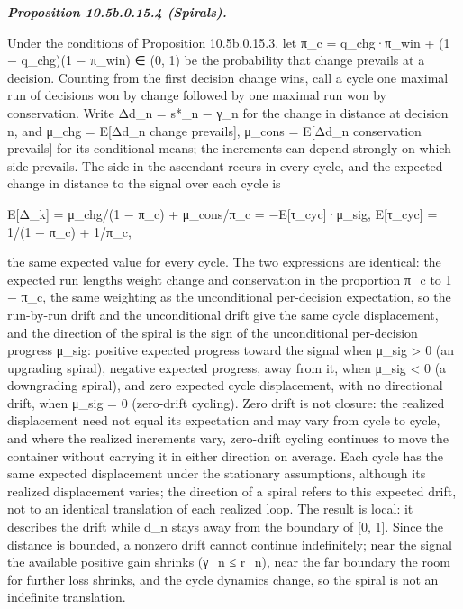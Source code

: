 \documentclass[
]{article}
\begin{document}
\emph{\textbf{Proposition 10.5b.0.15.4 (Spirals).}}

Under the conditions of Proposition 10.5b.0.15.3, let π\_c =
q\_chg·π\_win + (1 − q\_chg)(1 − π\_win) ∈ (0, 1) be the probability
that change prevails at a decision. Counting from the first decision
change wins, call a cycle one maximal run of decisions won by change
followed by one maximal run won by conservation. Write Δd\_n = s*\_n −
γ\_n for the change in distance at decision n, and μ\_chg = E{[}Δd\_n
\textbar{} change prevails{]}, μ\_cons = E{[}Δd\_n \textbar{}
conservation prevails{]} for its conditional means; the increments can
depend strongly on which side prevails. The side in the ascendant recurs
in every cycle, and the expected change in distance to the signal over
each cycle is

E{[}Δ\_k{]} = μ\_chg/(1 − π\_c) + μ\_cons/π\_c = −E{[}τ\_cyc{]}·μ\_sig,
E{[}τ\_cyc{]} = 1/(1 − π\_c) + 1/π\_c,

the same expected value for every cycle. The two expressions are
identical: the expected run lengths weight change and conservation in
the proportion π\_c to 1 − π\_c, the same weighting as the unconditional
per-decision expectation, so the run-by-run drift and the unconditional
drift give the same cycle displacement, and the direction of the spiral
is the sign of the unconditional per-decision progress μ\_sig: positive
expected progress toward the signal when μ\_sig \textgreater{} 0 (an
upgrading spiral), negative expected progress, away from it, when μ\_sig
\textless{} 0 (a downgrading spiral), and zero expected cycle
displacement, with no directional drift, when μ\_sig = 0 (zero-drift
cycling). Zero drift is not closure: the realized displacement need not
equal its expectation and may vary from cycle to cycle, and where the
realized increments vary, zero-drift cycling continues to move the
container without carrying it in either direction on average. Each cycle
has the same expected displacement under the stationary assumptions,
although its realized displacement varies; the direction of a spiral
refers to this expected drift, not to an identical translation of each
realized loop. The result is local: it describes the drift while d\_n
stays away from the boundary of {[}0, 1{]}. Since the distance is
bounded, a nonzero drift cannot continue indefinitely; near the signal
the available positive gain shrinks (γ\_n ≤ r\_n), near the far boundary
the room for further loss shrinks, and the cycle dynamics change, so the
spiral is not an indefinite translation.
\end{document}
